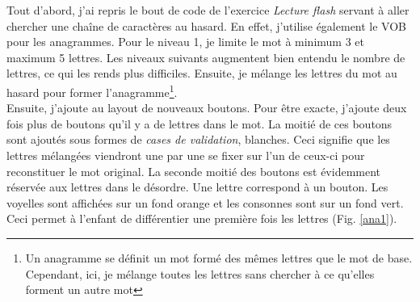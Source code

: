 Tout d'abord, j'ai repris le bout de code de l'exercice \textit{Lecture flash} servant à aller chercher une chaîne de caractères au hasard. En effet, j'utilise également le VOB pour les anagrammes. Pour le niveau 1, je limite le mot à minimum 3 et maximum 5 lettres. Les niveaux suivants augmentent bien entendu le nombre de lettres, ce qui les rends plus difficiles. Ensuite, je mélange les lettres du mot au hasard pour former l'anagramme\footnote{Un anagramme se définit un mot formé des mêmes lettres que le mot de base. Cependant, ici, je mélange toutes les lettres sans chercher à ce qu'elles forment un autre mot}.\\

Ensuite, j'ajoute au layout de nouveaux boutons. Pour être exacte, j'ajoute deux fois plus de boutons qu'il y a de lettres dans le mot. La moitié de ces boutons sont ajoutés sous formes de \textit{cases de validation}, blanches. Ceci signifie que les lettres mélangées viendront une par une se fixer sur l'un de ceux-ci pour reconstituer le mot original. La seconde moitié des boutons est évidemment réservée aux lettres dans le désordre. Une lettre correspond à un bouton. Les voyelles sont affichées sur un fond orange et les consonnes sont sur un fond vert. Ceci permet à l'enfant de différentier une première fois les lettres (Fig. \ref{ana1}).\\

